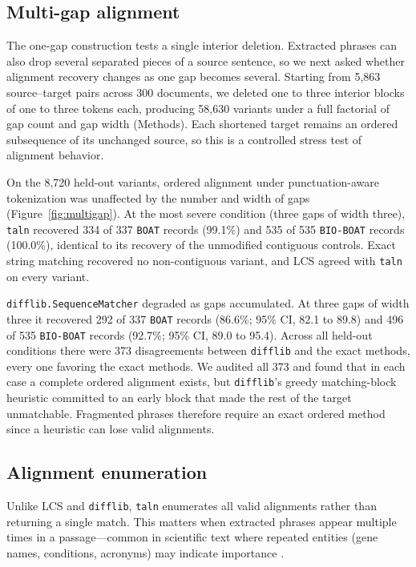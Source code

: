 \documentclass[10pt,twocolumn]{article}
\theoremstyle{plain}
\theoremstyle{definition}
\theoremstyle{remark}
\begin{document}
\subsection{Multi-gap alignment}
The one-gap construction tests a single interior deletion. Extracted phrases can also drop several separated pieces of a source sentence, so we next asked whether alignment recovery changes as one gap becomes several. Starting from 5,863 source--target pairs across 300 documents, we deleted one to three interior blocks of one to three tokens each, producing 58,630 variants under a full factorial of gap count and gap width (Methods). Each shortened target remains an ordered subsequence of its unchanged source, so this is a controlled stress test of alignment behavior.

On the 8,720 held-out variants, ordered alignment under punctuation-aware tokenization was unaffected by the number and width of gaps (Figure~\ref{fig:multigap}). At the most severe condition (three gaps of width three), \texttt{taln} recovered 334 of 337 \texttt{BOAT} records (99.1\%) and 535 of 535 \texttt{BIO-BOAT} records (100.0\%), identical to its recovery of the unmodified contiguous controls. Exact string matching recovered no non-contiguous variant, and LCS agreed with \texttt{taln} on every variant.

\texttt{difflib.SequenceMatcher} degraded as gaps accumulated. At three gaps of width three it recovered 292 of 337 \texttt{BOAT} records (86.6\%; 95\% CI, 82.1 to 89.8) and 496 of 535 \texttt{BIO-BOAT} records (92.7\%; 95\% CI, 89.0 to 95.4). Across all held-out conditions there were 373 disagreements between \texttt{difflib} and the exact methods, every one favoring the exact methods. We audited all 373 and found that in each case a complete ordered alignment exists, but \texttt{difflib}'s greedy matching-block heuristic committed to an early block that made the rest of the target unmatchable. Fragmented phrases therefore require an exact ordered method since a heuristic can lose valid alignments.

\subsection{Alignment enumeration}
Unlike LCS and \texttt{difflib}, \texttt{taln} enumerates all valid alignments rather than returning a single match. This matters when extracted phrases appear multiple times in a passage---common in scientific text where repeated entities (gene names, conditions, acronyms) may indicate importance \citep{swayamdipta2018multimention, zhang2023howmanyanswers, moon2023extractive, wang2024mesaqa}.
\end{document}
